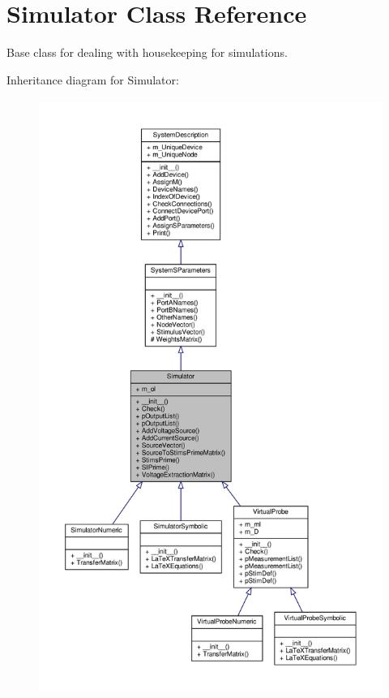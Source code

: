 \hypertarget{classSignalIntegrity_1_1SystemDescriptions_1_1Simulator_1_1Simulator}{}\section{Simulator Class Reference}
\label{classSignalIntegrity_1_1SystemDescriptions_1_1Simulator_1_1Simulator}


Base class for dealing with housekeeping for simulations.  




Inheritance diagram for Simulator\+:\nopagebreak
\begin{figure}[H]
\begin{center}
\leavevmode
\includegraphics[height=550pt]{classSignalIntegrity_1_1SystemDescriptions_1_1Simulator_1_1Simulator__inherit__graph}
\end{center}
\end{figure}



